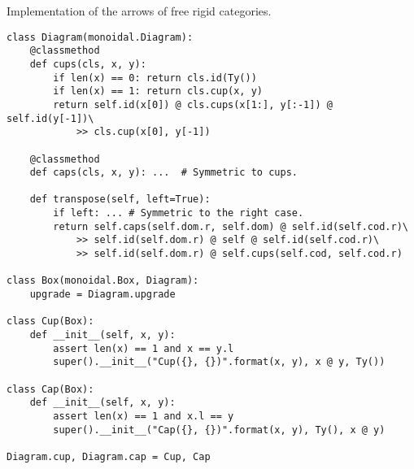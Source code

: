 \begin{python}
{\normalfont Implementation of the arrows of free rigid categories.}

\begin{verbatim}
class Diagram(monoidal.Diagram):
    @classmethod
    def cups(cls, x, y):
        if len(x) == 0: return cls.id(Ty())
        if len(x) == 1: return cls.cup(x, y)
        return self.id(x[0]) @ cls.cups(x[1:], y[:-1]) @ self.id(y[-1])\
            >> cls.cup(x[0], y[-1])

    @classmethod
    def caps(cls, x, y): ...  # Symmetric to cups.

    def transpose(self, left=True):
        if left: ... # Symmetric to the right case.
        return self.caps(self.dom.r, self.dom) @ self.id(self.cod.r)\
            >> self.id(self.dom.r) @ self @ self.id(self.cod.r)\
            >> self.id(self.dom.r) @ self.cups(self.cod, self.cod.r)

class Box(monoidal.Box, Diagram):
    upgrade = Diagram.upgrade

class Cup(Box):
    def __init__(self, x, y):
        assert len(x) == 1 and x == y.l
        super().__init__("Cup({}, {})".format(x, y), x @ y, Ty())

class Cap(Box):
    def __init__(self, x, y):
        assert len(x) == 1 and x.l == y
        super().__init__("Cap({}, {})".format(x, y), Ty(), x @ y)

Diagram.cup, Diagram.cap = Cup, Cap
\end{verbatim}
\end{python}

